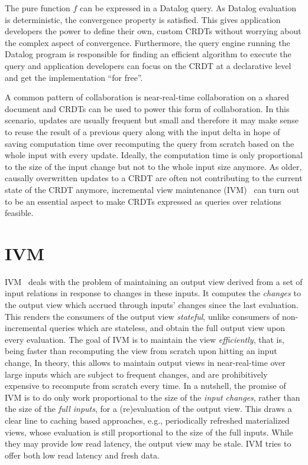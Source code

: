The pure function \( f \) can be expressed in a Datalog query.
As Datalog evaluation is deterministic, the convergence property is satisfied.
This gives application developers the power to define their own, custom CRDTs
without worrying about the complex aspect of convergence.
Furthermore, the query engine running the Datalog program is responsible
for finding an efficient algorithm to execute the query and application developers
can focus on the CRDT at a declarative level and get the implementation ``for free''.

A common pattern of collaboration is near-real-time collaboration on a shared
document and CRDTs can be used to power this form of collaboration.
In this scenario, updates are usually frequent but small and therefore it
may make sense to reuse the result of a previous query along with the input
delta in hope of saving computation time over recomputing the query from scratch
based on the whole input with every update.
Ideally, the computation time is only proportional to the size of the input
change but not to the whole input size anymore.
As older, causally overwritten updates to a CRDT are often not contributing
to the current state of the CRDT anymore, incremental view
maintenance (IVM)~\cite{mcsherry2013differential, budiu2022dbsp, budiu2024dbsp}
can turn out to be an essential aspect to make CRDTs expressed as
queries over relations feasible.

\section{\Acl{IVM}}

\Acl{IVM}~\cite{gupta1995maintenance} deals with the problem of maintaining
an output view derived from a set of input relations in response to changes
in these inputs.
It computes the \emph{changes} to the output view which accrued through
inputs' changes since the last evaluation.
This renders the consumers of the output view \emph{stateful},
unlike consumers of non-incremental queries which are stateless,
and obtain the full output view upon every evaluation.
The goal of \ac{IVM} is to maintain the view \emph{efficiently}, that is,
being faster than recomputing the view from scratch upon hitting an input change,
In theory, this allows to maintain output views in near-real-time over large
inputs which are subject to frequent changes, and are prohibitively expensive to
recompute from scratch every time.
In a nutshell, the promise of \ac{IVM} is to do only work proportional to the
size of the \emph{input changes}, rather than the size of the \emph{full inputs},
for a (re)evaluation of the output view.
This draws a clear line to caching based approaches, e.g., periodically
refreshed materialized views, whose evaluation is still proportional
to the size of the full inputs.
While they may provide low read latency, the output view may be stale.
\ac{IVM} tries to offer both low read latency and fresh data.

